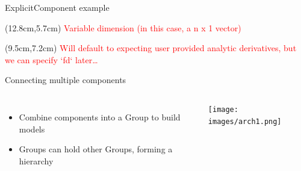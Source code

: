 \documentclass[aspectratio=169, usenames,dvipsnames, 14pt]{beamer}
\begin{document}
\begin{frame}{ExplicitComponent example}
{        \begin{textblock*}{3cm}(12.8cm,5.7cm)
            \footnotesize \textcolor{red}{Variable dimension (in this case, a n x 1 vector)}
        \end{textblock*}    
    
        \begin{textblock*}{3.6cm}(9.5cm,7.2cm)
            \footnotesize \textcolor{red}{Will default to expecting user provided analytic derivatives, but we can specify `fd` later…}
        \end{textblock*}   
  }
\end{frame}     %

\begin{frame}{Connecting multiple components}
\begin{columns}
        \begin{itemize}
            \item Combine components into a Group to build models
            \vspace{0.5cm}
            \item Groups can hold other Groups, forming a hierarchy
        \end{itemize}
    
        \texttt{[image: images/arch1.png]}
    \end{columns}
    
\end{frame}
\end{document}
